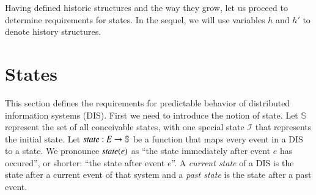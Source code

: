 \documentclass{elsarticle}
\def\id#1{\text{\em #1\/}}
\def\Events{{\mathit E}}
\begin{document}
	Having defined historic structures and the way they grow, let us proceed to determine requirements for states.
	In the sequel, we will use variables $h$ and $h'$ to denote history structures.

\section{States}
	This section defines the requirements for predictable behavior of distributed information systems (DIS).
	First we need to introduce the notion of state.
	Let $\mathbb S$ represent the set of all conceivable states,
	with one special state $\mathcal I$ that represents the initial state.
	Let $\id{state}:\Events\rightarrow{\mathbb S}$ be a function that maps every event in a DIS to a state.
	We pronounce $\id{state}(e)$ as ``the state immediately after event $e$ has occured'',
	or shorter: ``the state after event $e$''.
	A {\em current state} of a DIS is the state after a current event of that system
	and a {\em past state} is the state after a past event.
	
\end{document}

